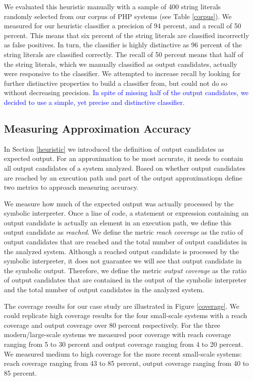 \documentclass[sigconf]{acmart}
\begin{document}
We evaluated this heuristic manually with a sample of 400 string
literals randomly selected from our corpus of PHP systems (see Table
\ref{corpus}). We measured for our heuristic classifier a precision of 94 percent, and a
recall of 50 percent. This means that six percent of the string literals are
classified incorrectly as false positives. In turn, the classifier is highly
distinctive as 96 percent of the string literals are classified correctly. The
recall of 50 percent means that half of the string literals, which we manually 
classified as output candidates, actually were responsive to the classifier. We
attempted to increase recall by looking for further distinctive properties to build a
classifier from, but could not do so without decreasing precision. 
\textcolor{blue}{In spite of missing half of the output candidates, we decided to use a simple, yet
precise and distinctive classifier.}

\subsection{Measuring Approximation Accuracy}
\label{HowAccurateIsOurApproximation} 
In Section \ref{heuristic} we introduced the definition of output candidates as
expected output. For an approximation to be most accurate, it needs to contain
all output candidates of a system analyzed. Based on whether output
candidates are reached by an execution path and part of the output
approximatiopn define two metrics to approach measuring accuracy.

We measure how much of the expected output was actually processed by the
symbolic interpreter.  Once a line of code, a statement or expression
containing an output candidate is actually an element in an execution path, we
define this output candidate as \emph{reached}. We define the metric \emph{reach
coverage} as the ratio of output candidates that are reached and the total
number of output candidates in the analyzed system. Although a reached output
candidate is processed by the symbolic interpreter, it does not guarantee we
will see that output candidate in the symbolic output. Therefore, we define the
metric \emph{output coverage} as the ratio of output candidates that are
contained in the output of the symbolic interpreter and the total number of
output candidates in the analyzed system.  

The coverage results for our case study are illustrated in Figure
\ref{coverage}. We could replicate high coverage results for the four small-scale systems with a reach
coverage and output coverage over 80 percent respectively. For the three
modern/large-scale systems we measured poor coverage with reach coverage
ranging from 5 to 30 percent and output coverage ranging from 4 to 20 percent.
We measured medium to high coverage for the more recent small-scale systems:
reach coverage ranging from 43 to 85 percent, output coverage ranging from 40
to 85 percent.
\end{document}
